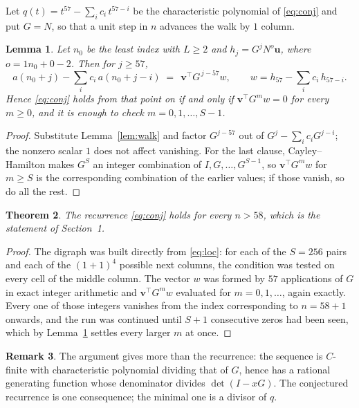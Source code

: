 \documentclass[11pt,a4paper]{article}
\theoremstyle{plain}
\newtheorem{theorem}{Theorem}
\newtheorem{lemma}[theorem]{Lemma}
\theoremstyle{definition}
\newtheorem{remark}[theorem]{Remark}
\begin{document}
Let $q(t)=t^{57}-\sum_i c_i\,t^{57-i}$ be the characteristic polynomial of
\eqref{eq:conj} and put $G=N$, so that a unit step in $n$ advances the walk by
$1$ column.

\begin{lemma}\label{lem:crit}
Let $n_0$ be the least index with $L\ge2$ and $h_j=G^{j}N^{o}\mathbf{u}$, where
$o=1n_0+0-2$. Then for $j\ge57$,
\[
a(n_0+j)-\sum_i c_i\,a(n_0+j-i)\;=\;\,\mathbf{v}^{\!\top}G^{\,j-57}w,
\qquad w=h_{57}-\sum_i c_i\,h_{57-i} .
\]
Hence \eqref{eq:conj} holds from that point on if and only if
$\mathbf{v}^{\!\top}G^{m}w=0$ for every $m\ge0$, and it is enough to check
$m=0,1,\dots,S-1$.
\end{lemma}

\begin{proof}
Substitute Lemma~\ref{lem:walk} and factor $G^{j-57}$ out of
$G^{j}-\sum_ic_iG^{j-i}$; the nonzero scalar $1$ does not affect
vanishing. For the last clause, Cayley--Hamilton makes $G^{S}$ an integer combination of
$I,G,\dots,G^{S-1}$, so $\mathbf{v}^{\!\top}G^{m}w$ for $m\ge S$ is the corresponding
combination of the earlier values; if those vanish, so do all the rest.
\end{proof}

\begin{theorem}
The recurrence \eqref{eq:conj} holds for every $n>58$, which is the statement of
Section~1.
\end{theorem}

\begin{proof}
The digraph was built directly from \eqref{eq:loc}: for each of the $S=256$ pairs and each
of the $(1+1)^{4}$ possible next columns, the condition was tested on every cell of
the middle column. The vector $w$ was formed by $57$ applications of $G$ in exact integer
arithmetic and $\mathbf{v}^{\!\top}G^{m}w$ evaluated for $m=0,1,\dots$, again exactly.
Every one of those integers vanishes from the index corresponding to $n=58+1$ onwards,
and the run was continued until $S+1$ consecutive zeros had been seen, which by
Lemma~\ref{lem:crit} settles every larger $m$ at once.
\end{proof}

\begin{remark}
The argument gives more than the recurrence: the sequence is $C$-finite with characteristic
polynomial dividing that of $G$, hence has a rational generating function whose denominator
divides $\det(I-xG)$. The conjectured recurrence is one consequence; the minimal one is a
divisor of $q$.
\end{remark}
\end{document}
